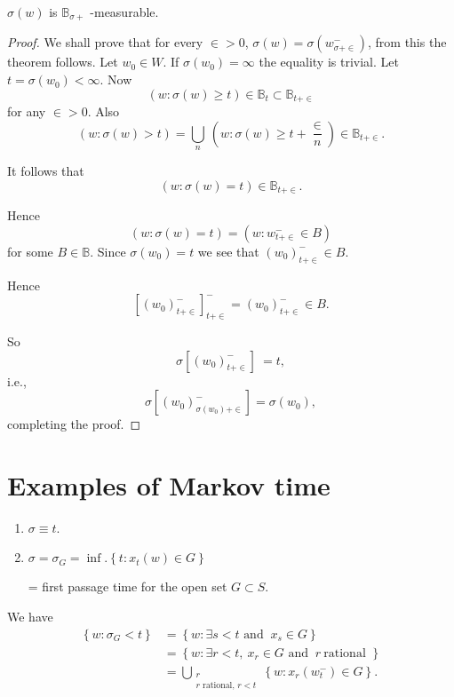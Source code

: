 \begin{theorem*} 
$\sigma (w)$ is $\mathbb{B}_{\sigma +}$ -measurable.
\end{theorem*}

\begin{proof}
We shall prove that for every $\in > 0$, $\sigma (w) = \sigma
  (w^-_{\sigma + \in})$, from this the theorem follows. Let $w_0 \in
  W$. If $\sigma (w_0) = \infty$ the equality is trivial. Let $t =
  \sigma (w_0) < \infty$. Now  
  $$
  (w :\sigma (w) \ge t )\in \mathbb{B}_{t} \subset \mathbb{B}_{t + \in}
  $$
  for any $\in > 0$. Also
  $$
  ( w: \sigma (w) > t) = \bigcup_{n} ~ \left(w : \sigma (w)\ge t +
  \frac{\in}{n} \right) \in \mathbb{B}_{t + \in}. 
  $$


It follows that 
$$
(w : \sigma (w) = t ) \in \mathbb{B}_{t + \in}.
$$

Hence
$$
( w : \sigma (w) = t ) = ( w : w^-_{t + \in} \in B )
$$
for some $B \in \mathbb{B}$. Since $\sigma (w_0) = t$ we see that
$(w_0)^-_{t + \in} \in B$. 

Hence 
$$
\left[ (w_0)^-_{t + \in}
    \right]^-_{t + \in} = (w_0)^-_{t + \in} \in B.
$$

So
$$
\sigma \left[
    (w_0)^-_{t + \in} \right] ~ = t,
$$
i.e.,
$$
\sigma \left[ (w_0)^-_{\sigma (w_0) + \in} \right] = \sigma (w_0),
$$
completing the proof.
\end{proof}

\section{Examples of Markov time}\label{chap2-sec2}\pageoriginale

\begin{enumerate}
\item $\sigma \equiv t$.
\item $\sigma = \sigma_G = \inf. \left \{ t : x_t (w) \in G \right \}$ 

\quad = first passage time for the open set $G \subset S$.
\end{enumerate}



We have
\begin{align*}
  \left\{ w : \sigma_G < t \right \} &= \left\{ w : \exists s < t
  \text{ and } ~ x_s \in G \right \} \\ 
  &= \left \{ w: \exists r < t, ~ x_r \in G \text{ and } ~ r ~ \text{
    rational } \right \} \\ 
  &= \bigcup_{\substack {r \\ r \text{ rational, } r < t}} \left \{ w:
  x_r (w_t^-) \in G \right \}. 
\end{align*}

